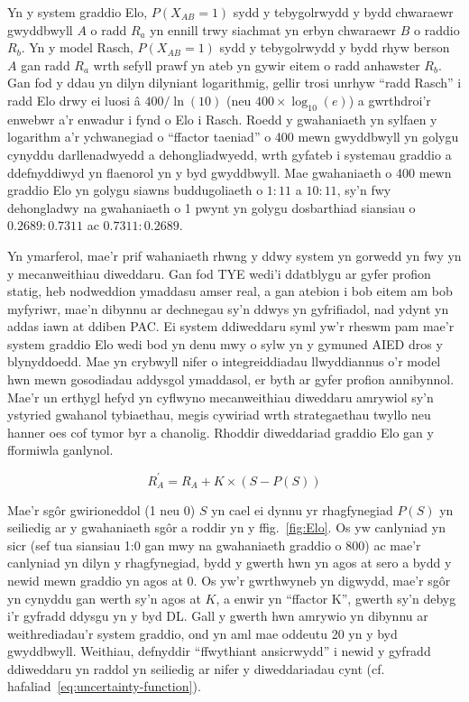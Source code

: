 Yn y system graddio Elo, $P(X_{AB} = 1)$ sydd y tebygolrwydd y bydd chwaraewr gwyddbwyll $A$ o radd $R_a$ yn ennill trwy siachmat yn erbyn chwaraewr $B$ o raddio $R_b$. Yn y model Rasch, $P(X_{AB} = 1)$ sydd y tebygolrwydd y bydd rhyw berson $A$ gan radd $R_a$ wrth sefyll prawf yn ateb yn gywir eitem o radd anhawster $R_b$. Gan fod y ddau yn dilyn dilyniant logarithmig, gellir trosi unrhyw ``radd Rasch'' i radd Elo drwy ei luosi â $400/\ln(10)$ (neu $400\times\log_{10}(e)$) a gwrthdroi'r enwebwr a'r enwadur i fynd o Elo i Rasch. Roedd y gwahaniaeth yn sylfaen y logarithm a'r ychwanegiad o ``ffactor taeniad'' o 400 mewn gwyddbwyll yn golygu cynyddu darllenadwyedd a dehongliadwyedd, wrth gyfateb i systemau graddio a ddefnyddiwyd yn flaenorol yn y byd gwyddbwyll. Mae gwahaniaeth o 400 mewn graddio Elo yn golygu siawns buddugoliaeth o $1:11$ a $10:11$, sy'n fwy dehongladwy na gwahaniaeth o 1 pwynt yn golygu dosbarthiad siansiau o $0.2689:0.7311$ ac $0.7311:0.2689$.

Yn ymarferol, mae'r prif wahaniaeth rhwng y ddwy system yn gorwedd yn fwy yn y mecanweithiau diweddaru. Gan fod TYE wedi'i ddatblygu ar gyfer profion statig, heb nodweddion ymaddasu amser real, a gan atebion i bob eitem am bob myfyriwr, mae'n dibynnu ar dechnegau sy'n ddwys yn gyfrifiadol, nad ydynt yn addas iawn at ddiben PAC\@. Ei system ddiweddaru syml yw'r rheswm pam mae'r system graddio Elo wedi bod yn denu mwy o sylw yn y gymuned AIED dros y blynyddoedd. Mae \cite{pelanek_applications_2016} yn crybwyll nifer o integreiddiadau llwyddiannus o'r model hwn mewn gosodiadau addysgol ymaddasol, er byth ar gyfer profion annibynnol. Mae'r un erthygl hefyd yn cyflwyno mecanweithiau diweddaru amrywiol sy'n ystyried gwahanol tybiaethau, megis cywiriad wrth strategaethau twyllo neu hanner oes cof tymor byr a chanolig. Rhoddir diweddariad graddio Elo gan y fformiwla ganlynol.

\begin{equation}
    R_{A}^{\prime}= R_A+K \times{(S-P(S))}
\end{equation}\label{eq:Update Elo}

Mae'r sgôr gwirioneddol (1 neu 0) $S$ yn cael ei dynnu yr rhagfynegiad $P(S)$ yn seiliedig ar y gwahaniaeth sgôr a roddir yn y ffig.~\ref{fig:Elo}. Os yw canlyniad yn sicr (sef tua siansiau  1:0 gan mwy na gwahaniaeth graddio o 800) ac mae'r canlyniad yn dilyn y rhagfynegiad, bydd y gwerth hwn yn agos at sero a bydd y newid mewn graddio yn agos at 0. Os yw'r gwrthwyneb yn digwydd, mae'r sgôr yn cynyddu gan werth sy'n agos at $K$, a enwir yn ``ffactor K'', gwerth sy'n debyg i'r gyfradd ddysgu yn y byd DL. Gall y gwerth hwn amrywio yn dibynnu ar weithrediadau'r system graddio, ond yn aml mae oddeutu 20 yn y byd gwyddbwyll. Weithiau, defnyddir ``ffwythiant ansicrwydd'' i newid y gyfradd ddiweddaru yn raddol yn seiliedig ar nifer y diweddariadau cynt (cf. hafaliad~\ref{eq:uncertainty-function}).

